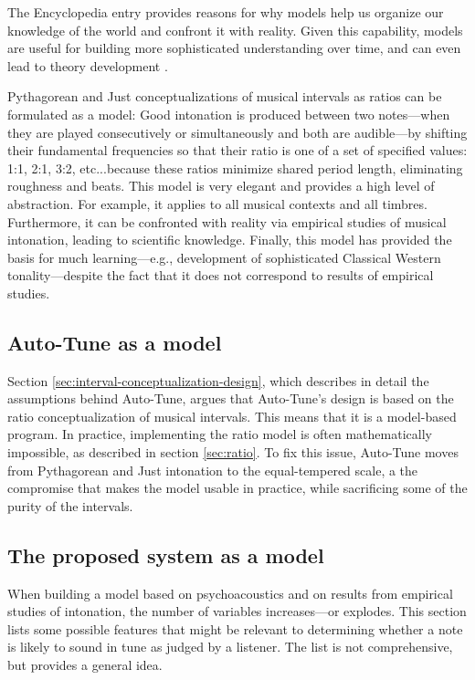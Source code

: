 The Encyclopedia entry provides reasons for why models help us organize our knowledge of the world and confront it with reality. Given this capability, models are useful for building more sophisticated understanding over time, and can even lead to theory development \cite{sep-models-science}.

Pythagorean and Just conceptualizations of musical intervals as ratios can be formulated as a model: Good intonation is produced between two notes---when they are played consecutively or simultaneously and both are audible---by shifting their fundamental frequencies so that their ratio is one of a set of specified values: 1:1, 2:1, 3:2, etc...because these ratios minimize shared period length, eliminating roughness and beats. This model is very elegant and provides a high level of abstraction. For example, it applies to all musical contexts and all timbres. Furthermore, it can be confronted with reality via empirical studies of musical intonation, leading to scientific knowledge. Finally, this model has provided the basis for much learning---e.g., development of sophisticated Classical Western tonality---despite the fact that it does not correspond to results of empirical studies. 

\subsection{Auto-Tune as a model}
Section \ref{sec:interval-conceptualization-design}, which describes in detail the assumptions behind Auto-Tune, argues that Auto-Tune's design is based on the ratio conceptualization of musical intervals. This means that it is a model-based program. In practice, implementing the ratio model is often mathematically impossible, as described in section \ref{sec:ratio}. To fix this issue, Auto-Tune moves from Pythagorean and Just intonation to the equal-tempered scale, a the compromise that makes the model usable in practice, while sacrificing some of the purity of the intervals.

\subsection{The proposed system as a model}
\label{sec:proposed-as-model}
When building a model based on psychoacoustics and on results from empirical studies of intonation, the number of variables increases---or explodes. This section lists some possible features that might be relevant to determining whether a note is likely to sound in tune as judged by a listener. The list is not comprehensive, but provides a general idea.

